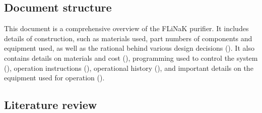 \subsection{Document structure}

This document is a comprehensive overview of the FLiNaK purifier. It includes
details of construction, such as materials used, part numbers of components
and equipment used, as well as the rational behind various design decisions
(). It also contains details on materials and cost
(), programming used to control the system
(), operation instructions (),
operational history (),
and important details on the equipment
used for operation ().

\subsection{Literature review}


\pagebreak
